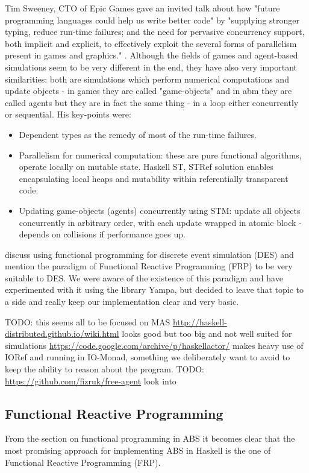 Tim Sweeney, CTO of Epic Games gave an invited talk about how "future programming languages could help us write better code" by "supplying stronger typing, reduce run-time failures;  and the need for pervasive concurrency support, both implicit and explicit, to effectively exploit the several forms of parallelism present in games and graphics." \cite{sweeney_next_2006}. Although the fields of games and agent-based simulations seem to be very different in the end, they have also very important similarities: both are simulations which perform numerical computations and update objects - in games they are called "game-objects" and in abm they are called agents but they are in fact the same thing - in a loop either concurrently or sequential. His key-points were:

\begin{itemize}
\item Dependent types as the remedy of most of the run-time failures.
\item Parallelism for numerical computation: these are pure functional algorithms, operate locally on mutable state. Haskell ST, STRef solution enables encapsulating local heaps and mutability within referentially transparent code.
\item Updating game-objects (agents) concurrently using STM: update all objects concurrently in arbitrary order, with each update wrapped in atomic block - depends on collisions if performance goes up.
\end{itemize}

\cite{jankovic_functional_2007} discuss using functional programming for discrete event simulation (DES) and mention the paradigm of Functional Reactive Programming (FRP) to be very suitable to DES. We were aware of the existence of this paradigm and have experimented with it using the library Yampa, but decided to leave that topic to a side and really keep our implementation clear and very basic.

TODO: this seems all to be focused on MAS
\url{http://haskell-distributed.github.io/wiki.html} looks good but too big and not well suited for simulations
\url{https://code.google.com/archive/p/haskellactor/} makes heavy use of IORef and running in IO-Monad, something we deliberately want to avoid to keep the ability to reason about the program.
TODO: \url{https://github.com/fizruk/free-agent} look into

\subsection{Functional Reactive Programming}
From the section on functional programming in ABS it becomes clear that the most promising approach for implementing ABS in Haskell is the one of Functional Reactive Programming (FRP). 

